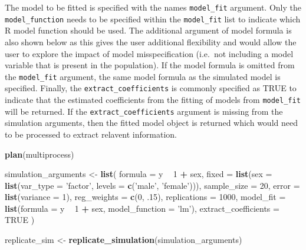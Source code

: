 \documentclass[man,mask,floatsintext]{apa6}
\newenvironment{Shaded}{\begin{snugshade}}{\end{snugshade}}
\newcommand{\DataTypeTok}[1]{\textcolor[rgb]{0.13,0.29,0.53}{#1}}
\newcommand{\DecValTok}[1]{\textcolor[rgb]{0.00,0.00,0.81}{#1}}
\newcommand{\FloatTok}[1]{\textcolor[rgb]{0.00,0.00,0.81}{#1}}
\newcommand{\KeywordTok}[1]{\textcolor[rgb]{0.13,0.29,0.53}{\textbf{#1}}}
\newcommand{\NormalTok}[1]{#1}
\newcommand{\OperatorTok}[1]{\textcolor[rgb]{0.81,0.36,0.00}{\textbf{#1}}}
\newcommand{\OtherTok}[1]{\textcolor[rgb]{0.56,0.35,0.01}{#1}}
\newcommand{\StringTok}[1]{\textcolor[rgb]{0.31,0.60,0.02}{#1}}
\begin{document}
The model to be fitted is specified with the names \texttt{model\_fit} argument. Only the \texttt{model\_function} needs to be specified within the \texttt{model\_fit} list to indicate which R model function should be used. The additional argument of model formula is also shown below as this gives the user additional flexibility and would allow the user to explore the impact of model misspecification (i.e.~not including a model variable that is present in the population). If the model formula is omitted from the \texttt{model\_fit} argument, the same model formula as the simulated model is specified. Finally, the \texttt{extract\_coefficients} is commonly specified as TRUE to indicate that the estimated coefficients from the fitting of models from \texttt{model\_fit} will be returned. If the \texttt{extract\_coefficients} argument is missing from the simulation arguments, then the fitted model object is returned which would need to be processed to extract relavent information.

\begin{Shaded}
\begin{Highlighting}[]
\KeywordTok{plan}\NormalTok{(multiprocess)}

\NormalTok{simulation_arguments <-}\StringTok{ }\KeywordTok{list}\NormalTok{(}
  \DataTypeTok{formula =}\NormalTok{ y }\OperatorTok{~}\StringTok{ }\DecValTok{1} \OperatorTok{+}\StringTok{ }\NormalTok{sex,}
  \DataTypeTok{fixed =} \KeywordTok{list}\NormalTok{(}\DataTypeTok{sex =} \KeywordTok{list}\NormalTok{(}\DataTypeTok{var_type =} \StringTok{'factor'}\NormalTok{, }
                            \DataTypeTok{levels =} \KeywordTok{c}\NormalTok{(}\StringTok{'male'}\NormalTok{, }\StringTok{'female'}\NormalTok{))),}
  \DataTypeTok{sample_size =} \DecValTok{20}\NormalTok{,}
  \DataTypeTok{error =} \KeywordTok{list}\NormalTok{(}\DataTypeTok{variance =} \DecValTok{1}\NormalTok{),}
  \DataTypeTok{reg_weights =} \KeywordTok{c}\NormalTok{(}\DecValTok{0}\NormalTok{, }\FloatTok{.15}\NormalTok{),}
  \DataTypeTok{replications =} \DecValTok{1000}\NormalTok{,}
  \DataTypeTok{model_fit =} \KeywordTok{list}\NormalTok{(}\DataTypeTok{formula =}\NormalTok{ y }\OperatorTok{~}\StringTok{ }\DecValTok{1} \OperatorTok{+}\StringTok{ }\NormalTok{sex, }
                   \DataTypeTok{model_function =} \StringTok{'lm'}\NormalTok{),}
  \DataTypeTok{extract_coefficients =} \OtherTok{TRUE}
\NormalTok{)}

\NormalTok{replicate_sim <-}\StringTok{ }\KeywordTok{replicate_simulation}\NormalTok{(simulation_arguments)}
\end{Highlighting}
\end{Shaded}
\end{document}
